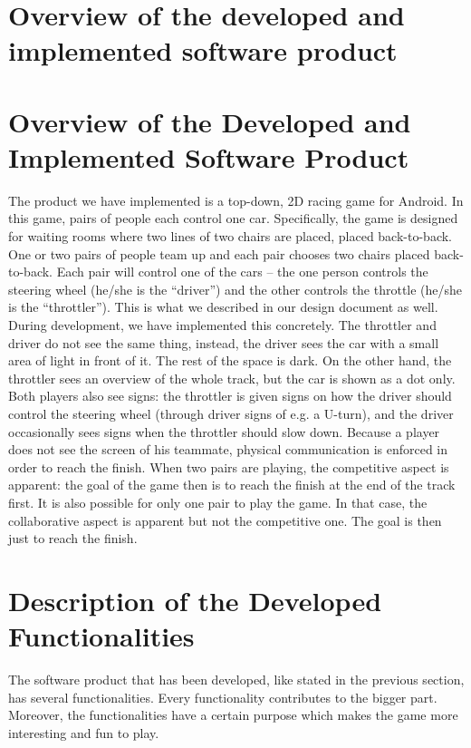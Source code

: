 \documentclass[11pt,twoside,a4paper]{article}
\begin{document}
\section{Overview of the developed and implemented software product}
\label{sec:overview}

\newpage

\section{Overview of the Developed and Implemented Software Product}
The product we have implemented is a top-down, 2D racing game for Android. In this game, pairs of people each control one car. Specifically, the game is designed for waiting rooms where two lines of two chairs are placed, placed back-to-back. One or two pairs of people team up and each pair chooses two chairs placed back-to-back. Each pair will control one of the cars – the one person controls the steering wheel (he/she is the “driver”) and the other controls the throttle (he/she is the “throttler”).
\newline\newline
This is what we described in our design document as well. During development, we have implemented this concretely. The throttler and driver do not see the same thing, instead, the driver sees the car with a small area of light in front of it. The rest of the space is dark. On the other hand, the throttler sees an overview of the whole track, but the car is shown as a dot only. Both players also see signs: the throttler is given signs on how the driver should control the steering wheel (through driver signs of e.g. a U-turn), and the driver occasionally sees signs when the throttler should slow down. Because a player does not see the screen of his teammate, physical communication is enforced in order to reach the finish.
\newline\newline
When two pairs are playing, the competitive aspect is apparent: the goal of the game then is to reach the finish at the end of the track first. It is also possible for only one pair to play the game. In that case, the collaborative aspect is apparent but not the competitive one. The goal is then just to reach the finish.

\newpage

\section{Description of the Developed Functionalities}
The software product that has been developed, like stated in the previous section, has several functionalities. Every functionality contributes to the bigger part. Moreover, the functionalities have a certain purpose which makes the game more interesting and fun to play. \\
\end{document}
